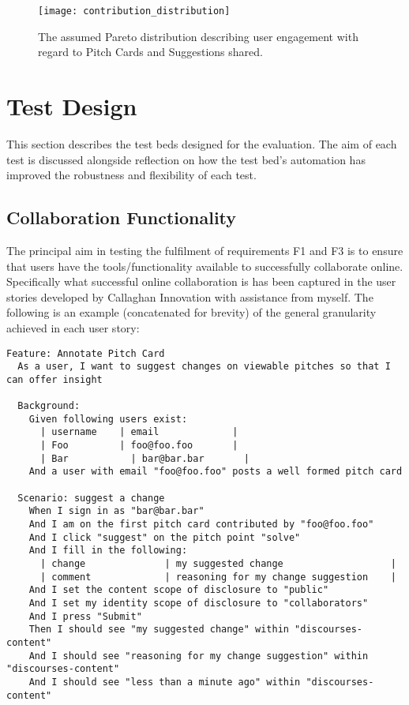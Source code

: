\begin{figure}[ht]
    \centering
    \texttt{[image: contribution\_distribution]}
    \caption{The assumed Pareto distribution describing user engagement with regard to Pitch Cards and Suggestions shared.}
    \label{fig:contribution_distribution}
\end{figure}

\section{Test Design}
This section describes the test beds designed for the evaluation. The aim of each test is discussed alongside reflection on how the test bed's automation has improved the robustness and flexibility of each test.

\subsection{Collaboration Functionality}\label{SS:collaborativeFunctionality}
The principal aim in testing the fulfilment of requirements F1 and F3 is to ensure that users have the tools/functionality available to successfully collaborate online. Specifically what successful online collaboration is has been captured in the user stories developed by Callaghan Innovation with assistance from myself. The following is an example (concatenated for brevity) of the general granularity achieved in each user story:

\begin{verbatim}
Feature: Annotate Pitch Card
  As a user, I want to suggest changes on viewable pitches so that I can offer insight

  Background:
    Given following users exist:
      | username    | email             |
      | Foo	        | foo@foo.foo       |
      | Bar      	  | bar@bar.bar       |
    And a user with email "foo@foo.foo" posts a well formed pitch card

  Scenario: suggest a change
    When I sign in as "bar@bar.bar"
    And I am on the first pitch card contributed by "foo@foo.foo"
    And I click "suggest" on the pitch point "solve"
    And I fill in the following:
      | change              | my suggested change                   |
      | comment             | reasoning for my change suggestion    |
    And I set the content scope of disclosure to "public"
    And I set my identity scope of disclosure to "collaborators"
    And I press "Submit"
    Then I should see "my suggested change" within "discourses-content"
    And I should see "reasoning for my change suggestion" within "discourses-content"
    And I should see "less than a minute ago" within "discourses-content"

\end{verbatim}

